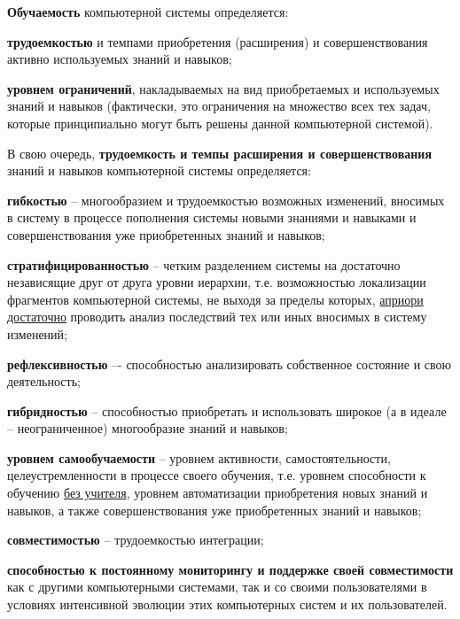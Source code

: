 \begin{SCn}
{\textbf{Обучаемость} компьютерной системы определяется:

\begin{scnitemize}
    \item \textbf{трудоемкостью} и темпами приобретения (расширения) и совершенствования активно используемых знаний и навыков;
    \item \textbf{уровнем ограничений}, накладываемых на вид приобретаемых и используемых знаний и навыков (фактически, это ограничения на множество всех тех задач, которые принципиально могут быть решены данной компьютерной системой).
\end{scnitemize}

В свою очередь, \textbf{трудоемкость и темпы расширения и совершенствования} знаний и навыков компьютерной системы определяется:
\begin{scnitemize}
    \item \textbf{гибкостью} -- многообразием и трудоемкостью возможных изменений, вносимых в систему в процессе пополнения системы новыми знаниями и навыками и совершенствования уже приобретенных знаний и навыков;
    \item \textbf{стратифицированностью} -- четким разделением системы на достаточно независящие друг от друга уровни иерархии, т.е. возможностью локализации фрагментов компьютерной системы, не выходя за пределы которых, \uline{априори достаточно} проводить анализ последствий тех или иных вносимых в систему изменений;
    \item \textbf{рефлексивностью} –- способностью анализировать собственное состояние и свою деятельность;
    \item \textbf{гибридностью} -- способностью приобретать и использовать широкое (а в идеале -- неограниченное) многообразие знаний и навыков;
    \item \textbf{уровнем самообучаемости} -- уровнем активности, самостоятельности, целеустремленности в процессе своего обучения, т.е. уровнем способности к обучению \uline{без учителя}, уровнем автоматизации приобретения новых знаний и навыков, а также совершенствования уже приобретенных знаний и навыков;
    \item \textbf{совместимостью} -- трудоемкостью интеграции;
    \item \textbf{способностью к постоянному мониторингу и поддержке своей совместимости} как с другими компьютерными системами, так и со своими пользователями в условиях интенсивной эволюции этих компьютерных систем и их пользователей. 
\end{scnitemize}

}
\end{SCn}
